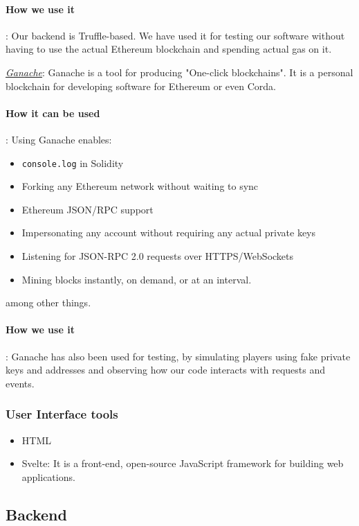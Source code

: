 \documentclass{article}
\begin{document}
\paragraph{How we use it}:
Our backend is Truffle-based. We have used it for testing our software without having to use the actual Ethereum blockchain and spending actual gas on it.

\href{https://trufflesuite.com/ganache/}{\textit{Ganache}}:
Ganache is a tool for producing "One-click blockchains". It is a personal blockchain for developing software for Ethereum or even Corda. 
\paragraph{How it can be used}:
Using Ganache enables:
\begin{itemize}
    \item \verb|console.log| in Solidity
    \item Forking any Ethereum network without waiting to sync
    \item Ethereum JSON/RPC support
    \item Impersonating any account without requiring any actual private keys
    \item Listening for JSON-RPC 2.0 requests over HTTPS/WebSockets
    \item Mining blocks instantly, on demand, or at an interval.
\end{itemize}
among other things.

\paragraph{How we use it}:
Ganache has also been used for testing, by simulating players using fake private keys and addresses and observing how our code interacts with requests and events.

\subsubsection{User Interface tools} 
\begin{itemize}
    \item HTML 
    \item Svelte: It is a front-end, open-source JavaScript framework  for building web applications. %
\end{itemize}




\subsection{Backend}
\end{document}

